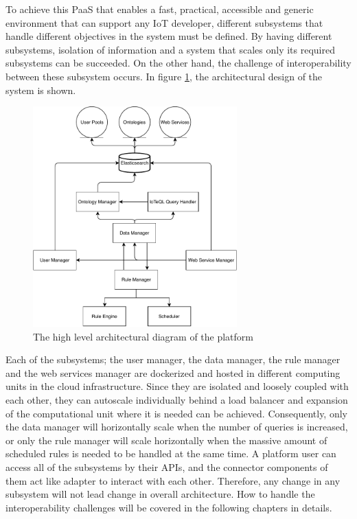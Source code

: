 To achieve this PaaS that enables a fast, practical, accessible and generic environment that can support any IoT developer, different subsystems that handle different objectives in the system must be defined. By having different subsystems,  isolation of information and a system that scales only its required subsystems can be succeeded. On the other hand, the challenge of interoperability between these subsystem occurs. In figure \ref{fig:architecture}, the architectural design of the system is shown.
\clearpage
\begin{figure}[h]
  \centering
  \includegraphics[width=0.7\textwidth,height=\textheight,keepaspectratio]{figures/high_level_architectural_diagram.pdf}
  \caption[Platform Architecture]{The high level architectural diagram of the platform}\label{fig:architecture}
\end{figure}

Each of the subsystems; the user manager, the data manager, the rule manager and the web services manager are dockerized and hosted in different computing units in the cloud infrastructure. Since they are isolated and loosely coupled with each other, they can autoscale individually behind a load balancer and expansion of the computational unit where it is needed can be achieved. Consequently, only the data manager will horizontally scale when the number of queries is increased, or only the rule manager will scale horizontally when the massive amount of scheduled rules is needed to be handled at the same time. A platform user can access all of the subsystems by their APIs, and the connector components of them act like adapter to interact with each other. Therefore, any change in any subsystem will not lead change in overall architecture. How to handle the interoperability challenges will be covered in the following chapters in details.


